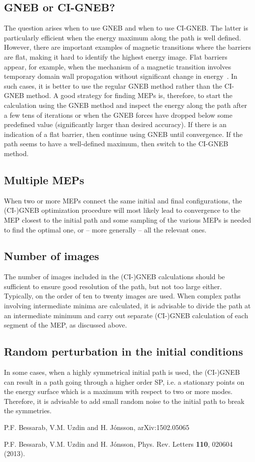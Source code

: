 \documentclass{article}
\begin{document}
\subsection{GNEB or CI-GNEB?}
The question arises when to use GNEB and when to use CI-GNEB. The latter is particularly efficient when the energy maximum along the path is well defined. However, there are important examples of magnetic transitions where the barriers are flat, making it hard to identify the highest energy image. Flat barriers appear, for example, when the mechanism of a magnetic transition involves temporary domain wall propagation without significant change in energy~\cite{bessarab_2013}. In such cases, it is better to use the regular GNEB method rather than the CI-GNEB method. A good strategy for finding MEPs is, therefore, to start the calculation using the GNEB method and inspect the energy along the path after a few tens of iterations or when the GNEB forces have dropped below some predefined value (significantly larger than desired accuracy). If there is an indication of a flat barrier, then continue using GNEB until convergence. If the path seems to have a well-defined maximum, then switch to the CI-GNEB method. 

\subsection{Multiple MEPs}
When two or more MEPs connect the same initial and final configurations, the (CI-)GNEB optimization procedure will most likely lead to convergence to the MEP closest to the initial path and some sampling of the various MEPs is needed to find the optimal one, or -- more generally -- all the relevant ones.

\subsection{Number of images}
The number of images included in the (CI-)GNEB calculations should be sufficient to ensure good resolution of the path, but not too large either. Typically, on the order of ten to twenty images are used. When complex paths involving intermediate minima are calculated, it is advisable to divide the path at an intermediate minimum and carry out separate (CI-)GNEB calculation of each segment of the MEP, as discussed above.

\subsection{Random perturbation in the initial conditions}
In some cases, when a highly symmetrical initial path
is used, the (CI-)GNEB can result in a path going through a higher order SP, i.e. a
stationary points on the energy surface which is a maximum with respect to
two or more modes. Therefore, it is advisable to add small
random noise to the initial path to break the symmetries.





\begin{thebibliography}{1}

 P.F. Bessarab, V.M. Uzdin and H. J\'onsson,
\newblock arXiv:1502.05065

 P.F. Bessarab, V.M. Uzdin and H. J\'onsson, 
\newblock Phys. Rev. Letters {\bf 110}, 020604 (2013).


\end{thebibliography}
\end{document}
